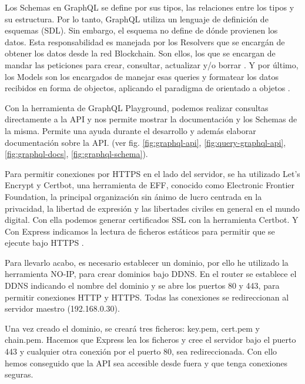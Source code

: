\noindent Los Schemas en GraphQL se define por sus tipos, las relaciones entre los tipos y su estructura. Por lo 
tanto, GraphQL utiliza un lenguaje de definición de esquemas (SDL). Sin embargo, el esquema no define de dónde 
provienen los datos. Esta responsabilidad es manejada por los Resolvers que se encargán de obtener los datos desde la 
red Blockchain. Son ellos, los que se encargan de mandar las peticiones para crear, consultar, actualizar y/o borrar 
\cite{hyperledger-fabric-couchdb}. Y por último, los Models son los encargados de manejar esas queries y formatear los 
datos recibidos en forma de objectos, aplicando el paradigma de orientado a objetos \cite{graphql-server-tutorial, 
thinking-graphs}.

\vspace{5mm}

\noindent Con la herramienta de GraphQL Playground, podemos realizar consultas directamente a la API y nos permite 
mostrar la documentación y los Schemas de la misma. Permite una ayuda durante el desarrollo y además elaborar 
documentación sobre la API. (ver fig. \ref{fig:graphql-api}, \ref{fig:query-graphql-api}, \ref{fig:graphql-docs}, 
\ref{fig:graphql-schema}).

\vspace{5mm}

\noindent Para permitir conexiones por HTTPS en el lado del servidor, se ha utilizado Let's Encrypt y Certbot, una 
herramienta de EFF, conocido como Electronic Frontier Foundation, la principal organización sin ánimo de lucro centrada 
en la privacidad, la libertad de expresión y las libertades civiles en general en el mundo digital. Con ella podemos 
generar certificados SSL con la herramienta Certbot. Y Con Express indicamos la lectura de ficheros estáticos para 
permitir que se ejecute bajo HTTPS \cite{setup-lets-encrypt}. 

\vspace{5mm}

\noindent Para llevarlo acabo, es necesario establecer un dominio, por ello he utilizado la herramienta NO-IP, para crear 
dominios bajo DDNS. En el router se establece el DDNS indicando el nombre del dominio y se abre los puertos 80 y 443, para 
permitir conexiones HTTP y HTTPS. Todas las conexiones se redireccionan al servidor maestro (192.168.0.30).

\vspace{5mm}

\noindent Una vez creado el dominio, se creará tres ficheros: key.pem, cert.pem y chain.pem. Hacemos que Express lea los 
ficheros y cree el servidor bajo el puerto 443 y cualquier otra conexión por el puerto 80, sea redireccionada. Con ello 
hemos conseguido que la API sea accesible desde fuera y que tenga conexiones seguras.

